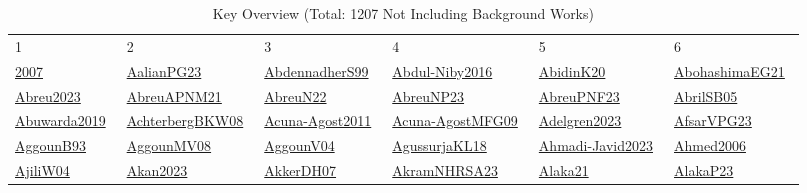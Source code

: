 \begin{longtable}{*{6}{l}}
\rowcolor{white}\caption{Key Overview (Total: 1207 Not Including Background Works)}\\ \toprule
\rowcolor{white}1 & 2 & 3 & 4 & 5 & 6\\ \midrule
\endhead
\bottomrule
\endfoot
\href{../}{2007}~\cite{2007} & \href{../scheduling/works/AalianPG23.pdf}{AalianPG23}~\cite{AalianPG23} & \href{../scheduling/works/AbdennadherS99.pdf}{AbdennadherS99}~\cite{AbdennadherS99} & \href{../scheduling/works/Abdul-Niby2016.pdf}{Abdul-Niby2016}~\cite{Abdul-Niby2016} & \href{../scheduling/works/AbidinK20.pdf}{AbidinK20}~\cite{AbidinK20} & \href{../scheduling/works/AbohashimaEG21.pdf}{AbohashimaEG21}~\cite{AbohashimaEG21}\\ 
\href{../scheduling/works/Abreu2023.pdf}{Abreu2023}~\cite{Abreu2023} & \href{../scheduling/works/AbreuAPNM21.pdf}{AbreuAPNM21}~\cite{AbreuAPNM21} & \href{../scheduling/works/AbreuN22.pdf}{AbreuN22}~\cite{AbreuN22} & \href{../scheduling/works/AbreuNP23.pdf}{AbreuNP23}~\cite{AbreuNP23} & \href{../scheduling/works/AbreuPNF23.pdf}{AbreuPNF23}~\cite{AbreuPNF23} & \href{../scheduling/works/AbrilSB05.pdf}{AbrilSB05}~\cite{AbrilSB05}\\ 
\href{../}{Abuwarda2019}~\cite{Abuwarda2019} & \href{../scheduling/works/AchterbergBKW08.pdf}{AchterbergBKW08}~\cite{AchterbergBKW08} & \href{../scheduling/works/Acuna-Agost2011.pdf}{Acuna-Agost2011}~\cite{Acuna-Agost2011} & \href{../scheduling/works/Acuna-AgostMFG09.pdf}{Acuna-AgostMFG09}~\cite{Acuna-AgostMFG09} & \href{../scheduling/works/Adelgren2023.pdf}{Adelgren2023}~\cite{Adelgren2023} & \href{../scheduling/works/AfsarVPG23.pdf}{AfsarVPG23}~\cite{AfsarVPG23}\\ 
\href{../scheduling/works/AggounB93.pdf}{AggounB93}~\cite{AggounB93} & \href{../}{AggounMV08}~\cite{AggounMV08} & \href{../}{AggounV04}~\cite{AggounV04} & \href{../scheduling/works/AgussurjaKL18.pdf}{AgussurjaKL18}~\cite{AgussurjaKL18} & \href{../}{Ahmadi-Javid2023}~\cite{Ahmadi-Javid2023} & \href{../scheduling/works/Ahmed2006.pdf}{Ahmed2006}~\cite{Ahmed2006}\\ 
\href{../}{AjiliW04}~\cite{AjiliW04} & \href{../scheduling/works/Akan2023.pdf}{Akan2023}~\cite{Akan2023} & \href{../scheduling/works/AkkerDH07.pdf}{AkkerDH07}~\cite{AkkerDH07} & \href{../scheduling/works/AkramNHRSA23.pdf}{AkramNHRSA23}~\cite{AkramNHRSA23} & \href{../scheduling/works/Alaka21.pdf}{Alaka21}~\cite{Alaka21} & \href{../scheduling/works/AlakaP23.pdf}{AlakaP23}~\cite{AlakaP23}\\ 

\end{longtable}
